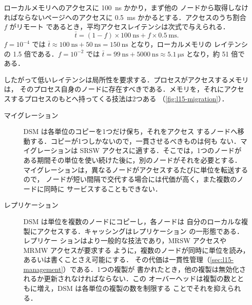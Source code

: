 \documentclass[../main.tex]{subfiles}
\begin{document}
\begin{example}
  \label{ex:l15-latency}
  ローカルメモリへのアクセスに \SI{100}{\nano\second} かかり，まず他の
  ノードから取得しなければならないページへのアクセスに
  \SI{0.5}{\milli\second} かかるとする．アクセスのうち割合 $f$ がリモート
  であるとき，平均アクセスレイテンシは次式で与えられる．
  \begin{equation}
    \bar{t} = (1-f)\times\SI{100}{\nano\second} + f\times\SI{0.5}{\milli\second} .
    \label{eq:l15-latency}
  \end{equation}
  $f=10^{-4}$ では $\bar{t} \approx \SI{100}{\nano\second} +
  \SI{50}{\nano\second} = \SI{150}{\nano\second}$ となり，ローカルメモリの
  レイテンシの 1.5 倍である．$f=10^{-2}$ では $\bar{t} =
  \SI{99}{\nano\second} + \SI{5000}{\nano\second} \approx
  \SI{5.1}{\micro\second}$ となり，約 51 倍である．
\end{example}

したがって低いレイテンシは局所性を要求する．プロセスがアクセスするメモリは，
そのプロセス自身のノードに存在すべきである．メモリを，それにアクセスするプロセスのもとへ持ってくる技法は2つある
（\cref{fig:l15-migration}）．
\begin{description}
  \item[マイグレーション] DSM は各単位のコピーを1つだけ保ち，それをアクセス
    するノードへ移動する．コピーが1つしかないので，一貫させるべきものは何も
    ない．マイグレーションは SRSW アクセスに適する．そこでは，1つのノードが
    ある期間その単位を使い続けた後に，別のノードがそれを必要とする．
    マイグレーションは，異なるノードがアクセスするたびに単位を転送するので，
    ノードが短い間隔で交代する場合には代価が高く，また複数のノードに同時に
    サービスすることもできない．
  \item[レプリケーション] DSM は単位を複数のノードにコピーし，各ノードは
    自分のローカルな複製にアクセスする．キャッシングはレプリケーション
    の一形態である．レプリケー
    ションはより一般的な技法であり，MRSW アクセスや MRMW アクセスが要求する
    ように，複数のノードが同時に単位を読み，あるいは書くことさえ可能にする．
    その代価は一貫性管理（\cref{sec:l15-management}）である．1つの複製が
    書かれたとき，他の複製は無効化されるか更新されなければならない．この
    オーバーヘッドは複製の数とともに増え，DSM は各単位の複製の数を制限する
    ことでそれを抑えられる．
\end{description}
\end{document}
